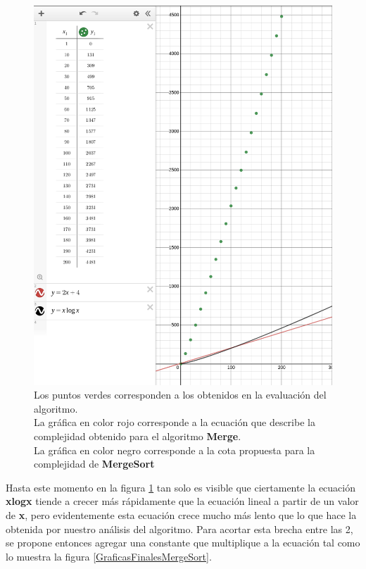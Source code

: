     \begin{figure}[h!]
        \centering
        \includegraphics[width=15cm]{MergeSort/GraficasPropuestaMergeSort.png}
        \caption{Los puntos verdes corresponden a los obtenidos en la evaluación del algoritmo.\\ La gráfica en color rojo corresponde a la ecuación que describe la complejidad obtenido para el algoritmo \textbf{Merge}.\\ La gráfica en color negro corresponde a la cota propuesta para la complejidad de \textbf{MergeSort}}
        \label{GraficasPropuestaMergeSort}
    \end{figure}
    
    \hfill \break
    \hfill \break
    \hfill \break
    \hfill \break
    \hfill \break
    
    Hasta este momento en la figura \ref{GraficasPropuestaMergeSort} tan solo es visible que ciertamente la ecuación \textbf{xlogx} tiende a crecer más rápidamente que la ecuación lineal a partir de un valor de \textbf{x}, pero evidentemente esta ecuación crece mucho más lento que lo que hace la obtenida por nuestro análisis del algoritmo. Para acortar esta brecha entre las 2, se propone entonces agregar una constante que multiplique a la ecuación tal como lo muestra la figura \ref{GraficasFinalesMergeSort}.
    
